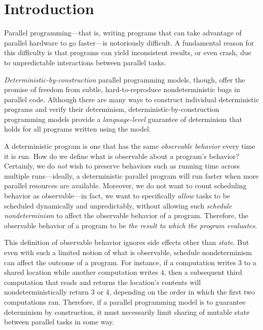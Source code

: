 \chapter{Introduction}\label{ch:intro} %

Parallel programming---that is, writing programs that can take
advantage of parallel hardware to go faster---is notoriously
difficult.  A fundamental reason for this difficulty is that programs
can yield inconsistent results, or even crash, due to unpredictable
interactions between parallel tasks.

\emph{Deterministic-by-construction} parallel programming models,
though, offer the promise of freedom from subtle, hard-to-reproduce
nondeterministic bugs in parallel code. Although there are many ways to
construct individual deterministic programs and verify their
determinism, deterministic-by-construction programming models provide
a \emph{language-level} guarantee of determinism
that holds for all programs written using the model.

A deterministic program is one that has the same \emph{observable
  behavior} every time it is run.  How do we define what is observable
about a program's behavior?  Certainly, we do \emph{not} wish to
preserve behaviors such as running time across multiple
runs---ideally, a deterministic parallel program will run faster when
more parallel resources are available.  Moreover, we do not want to
count scheduling behavior as observable---in fact, we want to
specifically \emph{allow} tasks to be scheduled dynamically and
unpredictably, without allowing such \emph{schedule nondeterminism} to
affect the observable behavior of a program.  Therefore,  the observable behavior of a program to be
\emph{the result to which the program evaluates}.


This definition of observable behavior ignores side effects other than
\emph{state}.  But even with such a limited notion of what is
observable, schedule nondeterminism can affect the outcome of a
program.  For instance, if a computation writes $3$ to a shared
location while another computation writes $4$, then a subsequent third
computation that reads and returns the location's contents will
nondeterministically return $3$ or $4$, depending on the order in
which the first two computations ran.  Therefore, if a parallel
programming model is to guarantee determinism by construction, it must
necessarily limit sharing of mutable state between parallel tasks in
some way.

